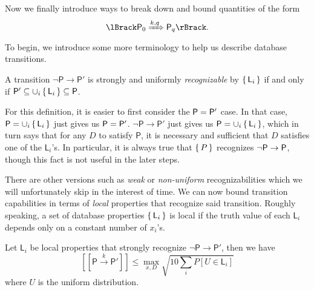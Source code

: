 Now we finally introduce ways to break down and bound quantities of the form 
$$\lBrack\sfP_0\xRightarrow{k,q}\sfP_q\rBrack.$$
To begin, we introduce some more terminology to help us describe database transitions.
\begin{defn}[Recognizability]
	A transition $\neg\mathsf{P}\rightarrow\mathsf{P}'$ is strongly and uniformly \emph{recognizable}
		by $\set{\mathsf{L}_i}$ if and only if $\mathsf{P}'\subseteq \cup_i\set{\mathsf{L}_i}\subseteq\mathsf{P}$.
\end{defn}

For this definition, it is easier to first consider the $\mathsf{P}=\mathsf{P}'$ case.
In that case, $\mathsf{P}=\cup_i\set{\mathsf{L}_i}$ just gives us $\mathsf{P}=\mathsf{P}'$.
$\neg\mathsf{P}\rightarrow\mathsf{P}'$ just gives us $\mathsf{P}=\cup_i\set{\mathsf{L}_i}$,
which in turn says that for any $D$ to satisfy $\mathsf{P}$, it is necessary and sufficient that $D$ satisfies one of the $\mathsf{L}_i$'s.
In particular, it is always true that $\set{P}$ recognizes $\neg\mathsf{P}\rightarrow\mathsf{P}$,
though this fact is not useful in the later steps.

There are other versions such as \emph{weak} or \emph{non-uniform} recognizabilities which we will unfortunately skip in the interest of time.
We can now bound transition capabilities in terms of \emph{local} properties that recognize said transition.
Roughly speaking, a set of database properties $\set{\mathsf{L}_i}$ is local if the truth value of each $\mathsf{L}_i$ depends only on a constant number of $x_i$'s.

\begin{thm}
	\label{property-to-bound}
	Let $\mathsf{L}_i$ be local properties that strongly recognize $\neg\mathsf{P}\rightarrow\mathsf{P}'$, then we have
	$$[\![\mathsf{P}\xrightarrow{k}\mathsf{P}']\!]\leq\max_{x, D}\sqrt{10\sum_iP[U\in\mathsf{L}_i]}$$
	where $U$ is the uniform distribution.
\end{thm}

